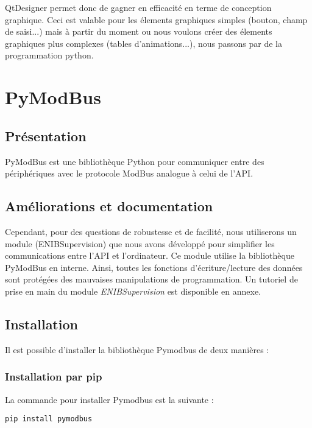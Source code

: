 \documentclass[12pt]{report}    %
\begin{document}
QtDesigner permet donc de gagner en efficacité en terme de conception graphique. Ceci est valable pour les élements graphiques simples (bouton, champ de saisi...) mais à partir du moment ou nous voulons créer des élements graphiques plus complexes (tables d'animations...), nous passons par de la programmation python. \newline



\section{PyModBus}
\subsection{Présentation}
PyModBus est une bibliothèque Python pour communiquer entre des périphériques avec le protocole ModBus analogue à celui de l'API.

\subsection{Améliorations et documentation}

Cependant, pour des questions de robustesse et de facilité, nous utiliserons un module (ENIBSupervision) que nous avons développé pour simplifier les communications entre l'API et l'ordinateur. \newline
Ce module utilise la bibliothèque PyModBus en interne.
 Ainsi, toutes les fonctions d'écriture/lecture des données sont protégées des mauvaises manipulations de programmation. \newline
Un tutoriel de prise en main du module \textit{ENIBSupervision} est disponible en annexe.

\subsection{Installation}

Il est possible d'installer la bibliothèque Pymodbus de deux manières : \newline

\subsubsection{Installation par pip}
La commande pour installer Pymodbus est la suivante :
\begin{lstlisting}
pip install pymodbus
\end{lstlisting}
\end{document}
